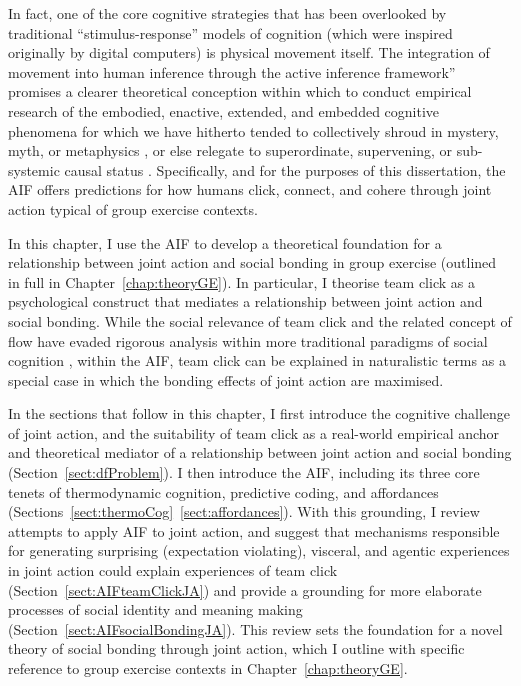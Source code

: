 \begin{CJK}{UTF8}{gbsn}
In fact, one of the core cognitive strategies that has been overlooked by traditional ``stimulus-response'' models of cognition (which were inspired originally by digital computers) is physical movement itself.  The integration of movement into human inference through the active inference framework'' \citep[hereafter AIF see][]{Friston2010} promises a clearer theoretical conception within which to conduct empirical research of the embodied, enactive, extended, and embedded cognitive phenomena for which we have hitherto tended to collectively shroud in mystery, myth, or metaphysics  \citep{Atran2010}, or else relegate to superordinate, supervening, or sub-systemic causal status   \citep{Clark2015,Linson2018}.  Specifically, and for the purposes of this dissertation, the AIF offers predictions for how humans click, connect, and cohere through joint action typical of group exercise contexts.

In this chapter, I use the AIF to develop a theoretical foundation for a relationship between joint action and social bonding in group exercise (outlined in full in Chapter~\ref{chap:theoryGE}).  In particular, I theorise team click as a psychological construct that mediates a relationship between joint action and social bonding.  While the social relevance of team click and the related concept of flow have evaded rigorous analysis within more traditional paradigms of social cognition \citep[for explanations as to why, see][]{Dietrich2004,Slingerland2014}, within the AIF, team click can be explained in naturalistic terms as a special case in which the bonding effects of joint action are maximised.









In the sections that follow in this chapter, I first introduce the cognitive challenge of joint action, and the suitability of team click as a real-world empirical anchor and theoretical mediator of a relationship between joint action and social bonding (Section~\ref{sect:dfProblem}).  I then introduce the AIF, including its three core tenets of thermodynamic cognition, predictive coding, and affordances (Sections~\ref{sect:thermoCog}\nobreakdash~\ref{sect:affordances}).  With this grounding, I review attempts to apply AIF to joint action, and suggest that mechanisms responsible for generating surprising (expectation violating), visceral, and agentic experiences in joint action could explain experiences of team click (Section~\ref{sect:AIFteamClickJA}) and provide a grounding for more elaborate processes of social identity and meaning making (Section~\ref{sect:AIFsocialBondingJA}).  This review sets the foundation for a novel theory of social bonding through joint action, which I outline with specific reference to group exercise contexts in Chapter~\ref{chap:theoryGE}.




\end{CJK}
